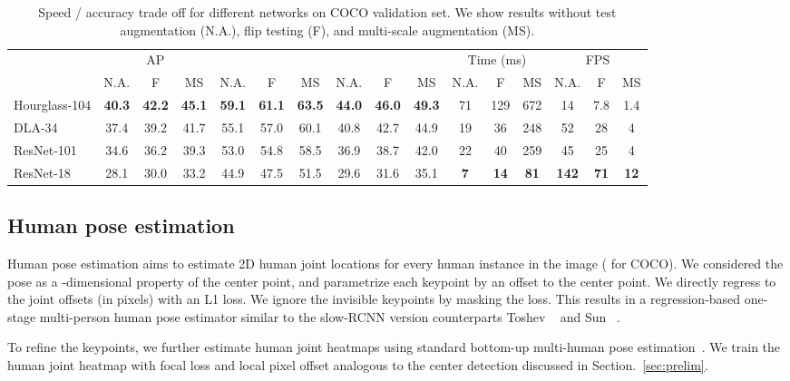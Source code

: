 \documentclass[10pt,twocolumn,letterpaper]{article}
\begin{document}
\begin{table*}[ht]
\centering
\begin{tabular}{l c@{\ \ }c@{\ \ }c @{\qquad} c@{\ \ }c@{\ \ }c @{\qquad} c@{\ \ }c@{\ \ }c @{\qquad} c@{\ \ }c@{\ \ }c @{\qquad} c@{\ \ }c@{\ \ }c}
\hline
 &  \multicolumn{3}{c}{AP} & \multicolumn{3}{c}{}  & \multicolumn{3}{c}{} & \multicolumn{3}{c}{Time (ms)} & \multicolumn{3}{c}{FPS}\\
 & N.A. & F & MS & N.A. & F & MS & N.A. & F & MS & N.A. & F & MS & N.A. & F & MS\\
\hline
Hourglass-104 & \textbf{40.3} & \textbf{42.2} & \textbf{45.1} & \textbf{59.1} & \textbf{61.1} & \textbf{63.5} & \textbf{44.0} & \textbf{46.0} & \textbf{49.3} & 71 & 129 & 672 & 14 & 7.8 & 1.4\\
DLA-34 & 37.4 & 39.2 & 41.7  & 55.1 & 57.0 & 60.1  & 40.8 & 42.7 & 44.9  & 19 & 36 & 248 & 52 & 28 & 4\\
ResNet-101 & 34.6 & 36.2 & 39.3 & 53.0 & 54.8 & 58.5 & 36.9 & 38.7 & 42.0 & 22 & 40 & 259 & 45 & 25 & 4\\
ResNet-18 & 28.1 & 30.0 & 33.2 & 44.9 & 47.5 & 51.5 & 29.6 & 31.6 & 35.1 & \textbf{7} & \textbf{14} & \textbf{81} & \textbf{142} & \textbf{71} & \textbf{12}\\
\hline
\end{tabular}
\caption{Speed / accuracy trade off for different networks on COCO validation set. We show results without test augmentation (N.A.), flip testing (F), and multi-scale augmentation (MS).}
\label{tab:network}
\vspace{-1em}
\end{table*}

\subsection{Human pose estimation}

Human pose estimation aims to estimate  2D human joint locations for every human instance in the image ( for COCO).
We considered the pose as a -dimensional property of the center point, and parametrize each keypoint by an offset to the center point.
We directly regress to the joint offsets (in pixels)  with an L1 loss.
We ignore the invisible keypoints by masking the loss.
This results in a regression-based one-stage multi-person human pose estimator similar to the slow-RCNN version counterparts Toshev \etal~\cite{toshev2014deeppose} and Sun \etal~\cite{sun2017compositional}.

To refine the keypoints, we further estimate  human joint heatmaps  using standard bottom-up multi-human pose estimation~\cite{cao2017realtime,newell2017associative,papandreou2018personlab}.
We train the human joint heatmap with focal loss and local pixel offset analogous to the center detection discussed in Section.~\ref{sec:prelim}.
\end{document}
